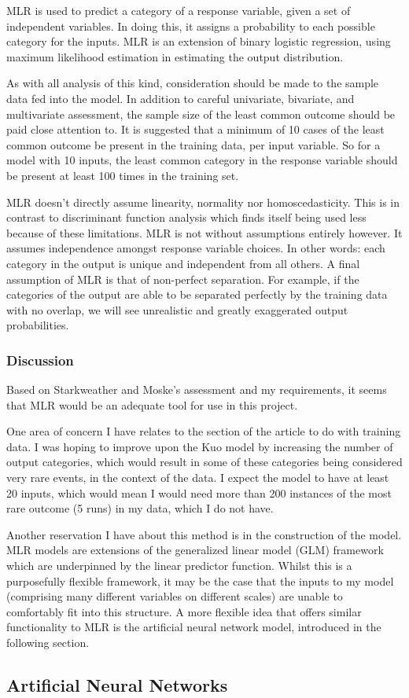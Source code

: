 MLR is used to predict a category of a response variable, given a set of independent variables. In doing this, it assigns a probability to each possible category for the inputs. MLR is an extension of binary logistic regression, using maximum likelihood estimation in estimating the output distribution.

As with all analysis of this kind, consideration should be made to the sample data fed into the model. In addition to careful univariate, bivariate, and multivariate assessment, the sample size of the least common outcome should be paid close attention to. It is suggested that a minimum of 10 cases of the least common outcome be present in the training data, per input variable. So for a model with 10 inputs, the least common category in the response variable should be present at least 100 times in the training set.

MLR doesn’t directly assume linearity, normality nor homoscedasticity. This is in contrast to discriminant function analysis which finds itself being used less because of these limitations. MLR is not without assumptions entirely however. It assumes independence amongst response variable choices. In other words: each category in the output is unique and independent from all others. A final assumption of MLR is that of non-perfect separation. For example, if the categories of the output are able to be separated perfectly by the training data with no overlap, we will see unrealistic and greatly exaggerated output probabilities.

\subsubsection{Discussion}

Based on Starkweather and Moske's assessment and my requirements, it seems that MLR would be an adequate tool for use in this project.

One area of concern I have relates to the section of the article to do with training data. I was hoping to improve upon the Kuo model by increasing the number of output categories, which would result in some of these categories being considered very rare events, in the context of the data. I expect the model to have at least 20 inputs, which would mean I would need more than 200 instances of the most rare outcome (5 runs) in my data, which I do not have.

Another reservation I have about this method is in the construction of the model. MLR models are extensions of the generalized linear model (GLM) framework which are underpinned by the linear predictor function. Whilst this is a purposefully flexible framework, it may be the case that the inputs to my model (comprising many different variables on different scales) are unable to comfortably fit into this structure. A more flexible idea that offers similar functionality to MLR is the artificial neural network model, introduced in the following section.

\subsection{Artificial Neural Networks}


